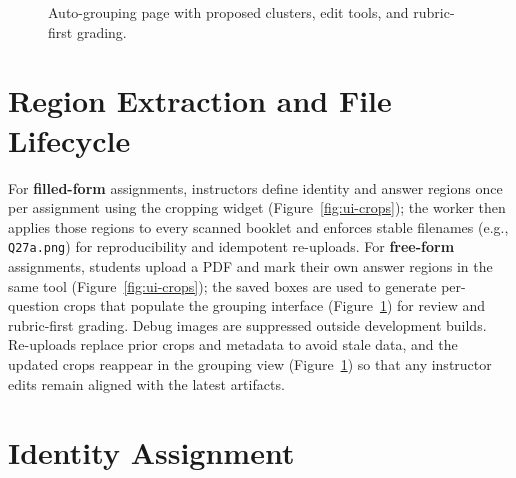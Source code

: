 \documentclass[ms,twoside,print]{nuthesis}
\begin{document}
\begin{figure}[htb]
  \centering
  \caption{Auto-grouping page with proposed clusters, edit tools, and rubric-first grading.}
  \label{fig:ui-grouping}
\end{figure}

\FloatBarrier %

\section{Region Extraction and File Lifecycle}

For \textbf{filled-form} assignments, instructors define identity and answer regions once per assignment using the cropping widget (Figure~\ref{fig:ui-crops}); the worker then applies those regions to every scanned booklet and enforces stable filenames (e.g., \texttt{Q27a.png}) for reproducibility and idempotent re-uploads. For \textbf{free-form} assignments, students upload a PDF and mark their own answer regions in the same tool (Figure~\ref{fig:ui-crops}); the saved boxes are used to generate per-question crops that populate the grouping interface (Figure~\ref{fig:ui-grouping}) for review and rubric-first grading. Debug images are suppressed outside development builds. Re-uploads replace prior crops and metadata to avoid stale data, and the updated crops reappear in the grouping view (Figure~\ref{fig:ui-grouping}) so that any instructor edits remain aligned with the latest artifacts.

\section{Identity Assignment}
\end{document}
